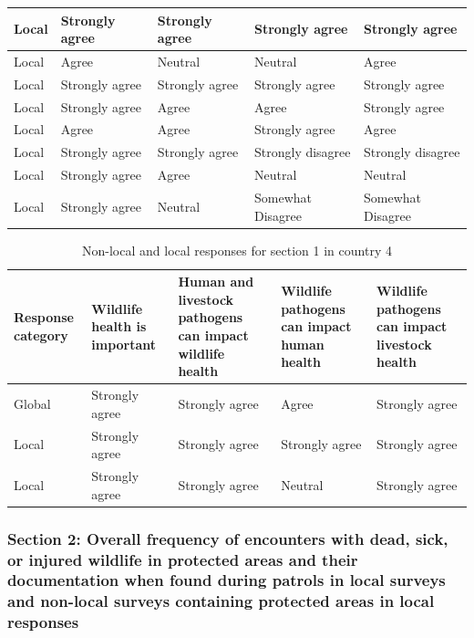 \documentclass[
  letterpaper,
  DIV=11,
  numbers=noendperiod]{scrartcl}
\begin{document}
\begin{table}[H]
\begin{tabular}[t]{>{\raggedright\arraybackslash}p{2cm}|>{\raggedright\arraybackslash}p{3cm}|>{\raggedright\arraybackslash}p{3cm}|>{\raggedright\arraybackslash}p{3cm}|>{\raggedright\arraybackslash}p{3cm}}
\hline
Local & Strongly agree & Strongly agree & Strongly agree & Strongly \vphantom{1} agree\\
\hline
Local & Agree & Neutral & Neutral & Agree\\
\hline
Local & Strongly agree & Strongly agree & Strongly agree & Strongly agree\\
\hline
Local & Strongly agree & Agree & Agree & Strongly agree\\
\hline
Local & Agree & Agree & Strongly agree & Agree\\
\hline
Local & Strongly agree & Strongly agree & Strongly disagree & Strongly disagree\\
\hline
Local & Strongly agree & Agree & Neutral & Neutral\\
\hline
Local & Strongly agree & Neutral & Somewhat Disagree & Somewhat Disagree\\
\hline
\end{tabular}
\end{table}

\begin{table}[H]

\caption{Non-local and local responses for section 1 in country 4}
\centering
\begin{tabular}[t]{>{\raggedright\arraybackslash}p{2cm}|>{\raggedright\arraybackslash}p{3cm}|>{\raggedright\arraybackslash}p{3cm}|>{\raggedright\arraybackslash}p{3cm}|>{\raggedright\arraybackslash}p{3cm}}
\hline
Response
category & Wildlife health
is important & Human and livestock
pathogens can
impact wildlife
health & Wildlife pathogens can
impact human health & Wildlife pathogens can
impact livestock health\\
\hline
Global & Strongly agree & Strongly agree & Agree & Strongly agree\\
\hline
Local & Strongly agree & Strongly agree & Strongly agree & Strongly agree\\
\hline
Local & Strongly agree & Strongly agree & Neutral & Strongly agree\\
\hline
\end{tabular}
\end{table}

\hypertarget{section-2-overall-frequency-of-encounters-with-dead-sick-or-injured-wildlife-in-protected-areas-and-their-documentation-when-found-during-patrols-in-local-surveys-and-non-local-surveys-containing-protected-areas-in-local-responses}{%
\subsubsection{Section 2: Overall frequency of encounters with dead,
sick, or injured wildlife in protected areas and their documentation
when found during patrols in local surveys and non-local surveys
containing protected areas in local
responses}\label{section-2-overall-frequency-of-encounters-with-dead-sick-or-injured-wildlife-in-protected-areas-and-their-documentation-when-found-during-patrols-in-local-surveys-and-non-local-surveys-containing-protected-areas-in-local-responses}}
\end{document}
